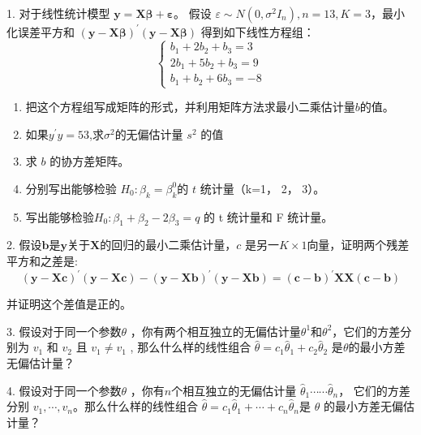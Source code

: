 1. 对于线性统计模型 $ \boldsymbol{ y=X \beta+\varepsilon } $。 
假设 $ \varepsilon \sim N\left(0, \sigma^{2} I_{n}\right), n=13, K=3 $，最小化误差平方和 $ \boldsymbol{ (y-X \beta)^{\prime}(y-X \beta)} $
得到如下线性方程组：
$$ \left\{\begin{array}{l}
    b_{1}+2 b_{2}+b_{3} = 3 \\
    2 b_{1}+5 b_{2}+b_{3} = 9 \\
    b_{1}+b_{2}+6 b_{3} = -8
    \end{array}\right. $$
\begin{enumerate}[(1)]
    \item 把这个方程组写成矩阵的形式，并利用矩阵方法求最小二乘估计量$ b $的值。
    \item 如果$ y^{\prime}y = 53 $,求$\sigma^{2} $的无偏估计量 $ s^{2}$ 的值
    \item 求 $ b $ 的协方差矩阵。
    \item 分别写出能够检验 $ H_{0}: \beta_{k}=\beta_{k}^{0} $的 $ t $ 统计量（k=1， 2， 3）。
    \item 写出能够检验$ H_{0}: \beta_{1}+\beta_{2}-2 \beta_{3}=q $ 的 t 统计量和 F 统计量。
\end{enumerate}

2. 假设$ \boldsymbol{ b } $是$ \boldsymbol{ y } $关于$ \boldsymbol{ X } $的回归的最小二乘估计量，$ c $ 是另一$ K \times 1 $向量，证明两个残差平方和之差是:
$$ \boldsymbol{ (y-X c)^{\prime}(y-X c)-(y-X b)^{\prime}(y-X b)=(c-b)^{\prime} X X(c-b)} $$ 

并证明这个差值是正的。

3. 假设对于同一个参数$ \theta $ ，你有两个相互独立的无偏估计量$ \theta^{1} $和$ \theta^{2} $，它们的方差分别为 $ v_{1} $ 和 $ v_{2} $ 且  $ v_{1} \neq v_{1} $  ,
那么什么样的线性组合 $ \hat{\theta}=c_{1} \hat{\theta}_{1}+c_{2} \hat{\theta}_{2} $ 是$ \theta $的最小方差无偏估计量？

4. 假设对于同一个参数$ \theta $ ，你有$ n $个相互独立的无偏估计量 $ \hat{\theta}_{1} \cdots \cdots \hat{\theta}_{n} $，
它们的方差分别 $ v_{1}, \cdots, v_{n} $。那么什么样的线性组合 $ \hat{\theta}=c_{1} \hat{\theta}_{1}+\cdots+c_{n} \hat{\theta}_{n} $是 $ \theta $  的最小方差无偏估计量？